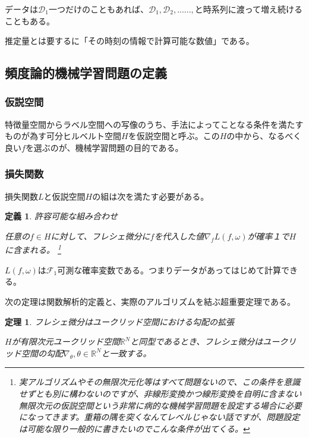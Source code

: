 \documentclass{jsarticle}
\newtheorem{theo}{定理}[section]
\newtheorem{defi}{定義}[section]
\begin{document}
データは$\mathcal{D}_1$一つだけのこともあれば、$\mathcal{D}_1,\mathcal{D}_2,......,$と時系列に渡って増え続けることもある。

推定量とは要するに「その時刻の情報で計算可能な数値」である。

\subsection{頻度論的機械学習問題の定義}



\subsubsection{仮説空間}

特徴量空間からラベル空間への写像のうち、手法によってことなる条件を満たすものが為す可分ヒルベルト空間$H$を仮説空間と呼ぶ。この$H$の中から、なるべく良い$f$を選ぶのが、機械学習問題の目的である。



\subsubsection{損失関数}

損失関数$L$と仮説空間$H$の組は次を満たす必要がある。
\begin{defi} 許容可能な組み合わせ

任意の$f\in H$に対して、フレシェ微分に$f$を代入した値$\nabla_fL(f,\omega)$が確率１で$H$に含まれる。
\footnote{実アルゴリズムやその無限次元化等はすべて問題ないので、この条件を意識せずとも別に構わないのですが、非線形変換かつ線形変換を自明に含まない無限次元の仮説空間という非常に病的な機械学習問題を設定する場合に必要になってきます。重箱の隅を突くなんてレベルじゃない話ですが、問題設定は可能な限り一般的に書きたいのでこんな条件が出てくる。}
\end{defi}

$L(f,\omega)$は$\mathcal{F}_1$可測な確率変数である。つまりデータがあってはじめて計算できる。

次の定理は関数解析的定義と、実際のアルゴリズムを結ぶ超重要定理である。

\begin{theo}フレシェ微分はユークリッド空間における勾配の拡張

$H$が有限次元ユークリッド空間$\mathbb{R}^N$と同型であるとき、フレシェ微分はユークリッド空間の勾配$\nabla_\theta,\theta\in\mathbb{R}^N$と一致する。

\end{theo}
\end{document}
